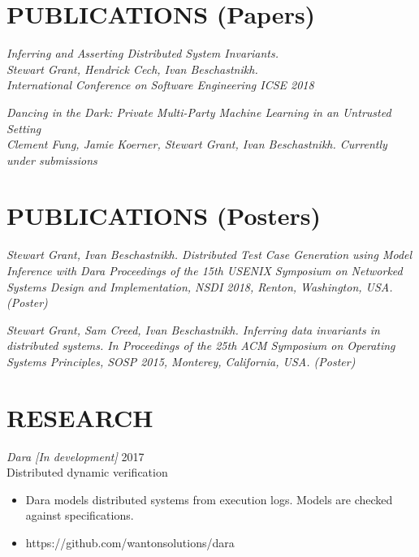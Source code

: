 \documentclass[line,margin]{res}
\begin{document}
\address{3549 Puget Drive, Vancouver, BC }
\address{(604) 970-2469}
\address{sgrant09@cs.ubc.ca}
\address{https://wantonsolutions.github.io/}
\begin{resume}

    \section{PUBLICATIONS (Papers)}


{\sl 
    Inferring and Asserting Distributed System Invariants. \\
    Stewart Grant, Hendrick Cech, Ivan Beschastnikh. \\
    International Conference on Software Engineering ICSE 2018 \\
    }

{\sl 
    Dancing in the Dark: Private Multi-Party Machine Learning in an Untrusted Setting \\
    Clement Fung, Jamie Koerner, Stewart Grant, Ivan Beschastnikh. 
    \it{Currently under submissions}}

\section{PUBLICATIONS (Posters)}

{\sl Stewart Grant, Ivan Beschastnikh. 
    Distributed Test Case Generation using Model Inference with Dara
    \it{Proceedings of the 15th
    USENIX Symposium on Networked Systems Design and Implementation, NSDI 2018},
    Renton, Washington, USA. (Poster)}

{\sl Stewart Grant, Sam Creed, Ivan Beschastnikh. Inferring data
    invariants in distributed systems. In \it{Proceedings of the 25th
    ACM Symposium on Operating Systems Principles, SOSP 2015},
    Monterey, California, USA. (Poster)}


\section{RESEARCH}

{\sl Dara [In development]} \hfill 2017\\
    Distributed dynamic verification
\begin{itemize} \itemsep -2pt
        \item Dara models distributed systems from execution logs. Models are checked against specifications.
        \item https://github.com/wantonsolutions/dara
\end{itemize}


\end{resume}
\end{document}
